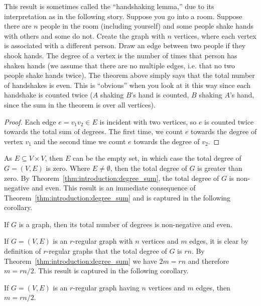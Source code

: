 This result is sometimes called the ``handshaking lemma,'' due to its
interpretation as in the following story. Suppose you go into a
room. Suppose there are $n$ people in the room (including yourself)
and some people shake hands with others and some do not. Create the
graph with $n$ vertices, where each vertex is associated with a
different person. Draw an edge between two people if they shook
hands. The degree of a vertex is the number of times that person has
shaken hands (we assume that there are no multiple edges, i.e. that no
two people shake hands twice). The theorem above simply says that the
total number of handshakes is even. This is ``obvious'' when you look
at it this way since each handshake is counted twice ($A$ shaking
$B$'s hand is counted, $B$ shaking $A$'s hand, since the sum in the
theorem is over all vertices).

\begin{proof}
Each edge $e = v_1 v_2 \in E$ is incident with two vertices, so $e$ is
counted twice towards the total sum of degrees. The first time, we
count $e$ towards the degree of vertex $v_1$ and the second time we
count $e$ towards the degree of $v_2$.
\end{proof}

As $E \subseteq V \times V$, then $E$ can be the empty set, in which
case the total degree of $G = (V, E)$ is zero. Where $E \neq
\emptyset$, then the total degree of $G$ is greater than zero. By
Theorem~\ref{thm:introduction:degree_sum}, the total degree of $G$ is
non-negative and even. This result is an immediate consequence of
Theorem~\ref{thm:introduction:degree_sum} and is captured in the
following corollary.

\begin{corollary}
\label{cor:introduction:degree_sum_even}
If $G$ is a graph, then its total number of degrees is non-negative
and even.
\end{corollary}

If $G = (V, E)$ is an $r$-regular graph with $n$ vertices and $m$
edges, it is clear by definition of $r$-regular graphs that the total
degree of $G$ is $rn$. By Theorem~\ref{thm:introduction:degree_sum} we
have $2m = rn$ and therefore $m = rn / 2$. This result is captured in
the following corollary.

\begin{corollary}
If $G = (V, E)$ is an $r$-regular graph having $n$ vertices and $m$
edges, then $m = rn / 2$.
\end{corollary}



